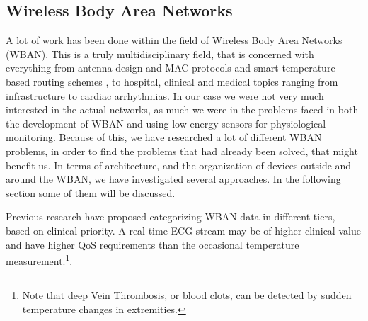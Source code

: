 


\subsection{Wireless Body Area Networks} %
\label{sub:wireless_body_area_networks}





A lot of work has been done within the field of Wireless Body Area Networks (WBAN). This is a truly multidisciplinary field, that is concerned with everything from antenna design and MAC protocols and smart temperature-based routing schemes \cite{Movassaghi:2014hi}, to hospital, clinical and medical topics ranging from infrastructure to cardiac arrhythmias. In our case we were not very much interested in the actual networks, as much we were in the problems faced in both the development of WBAN and using low energy sensors for physiological monitoring. Because of this, we have researched a lot of different WBAN problems, in order to find the problems that had already been solved, that might benefit us. In terms of architecture, and the organization of devices outside and around the WBAN, we have investigated several approaches. In the following section some of them will be discussed.

Previous research have proposed categorizing WBAN data in different tiers, based on clinical priority. A real-time ECG stream may be of higher clinical value and have higher QoS requirements than the occasional temperature measurement.\footnote{ Note that deep Vein Thrombosis, or blood clots, can be detected by sudden temperature changes in extremities.}.

